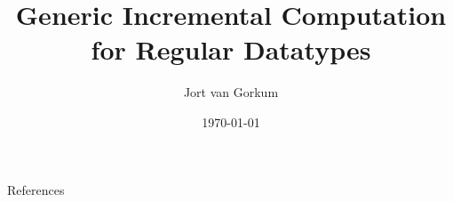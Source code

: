 \documentclass[aspectratio=169]{beamer}
\title{Generic Incremental Computation for Regular Datatypes}
\author{Jort van Gorkum}
\institute{Utrecht University}
\date{\today}
\begin{document}




% 

% 

% 

% 

% 

% 

% 

% 

% 

\begin{frame}{References}
\printbibliography
\end{frame}
\end{document}
